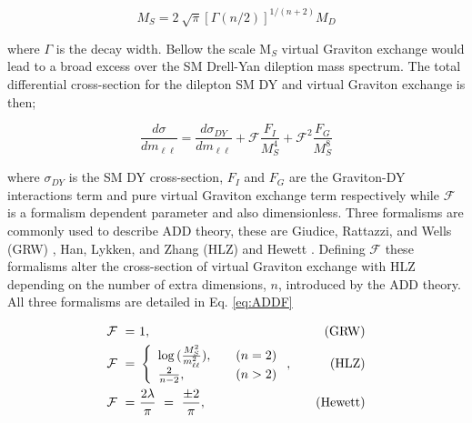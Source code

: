         \begin{equation}
            M_{S} = 2~\sqrt{\pi}\left[{\Gamma (n/2)}\right]^{1/(n+2)}M_{D}
            \label{eq:gravScale}
        \end{equation}

        where $\Gamma$ is the decay width. Bellow the scale M$_{S}$ virtual Graviton exchange would lead to a broad excess over the SM Drell-Yan dileption mass spectrum. 
        The total differential cross-section for the dilepton SM DY and virtual Graviton exchange is then;

        \begin{equation}
            \frac{d\sigma}{dm_{\ell\ell}} =
                \frac{d\sigma_{DY}}{dm_{\ell\ell}} +
                \mathcal{F}\frac{F_{I}}{M_{S}^{4}} +
                \mathcal{F}^{2}\frac{F_{G}}{M_{S}^{8}}
            \label{eq:ADDcs}
        \end{equation}

        where $\sigma_{DY}$ is the SM DY cross-section, $F_{I}$ and $F_{G}$ are the Graviton-DY interactions term and pure virtual Graviton exchange term respectively while $\mathcal{F}$ is a formalism dependent parameter and also dimensionless. 
        Three formalisms are commonly used to describe ADD theory, these are Giudice, Rattazzi, and Wells (GRW) \cite{Giudice:1998ck}, Han, Lykken, and Zhang (HLZ) \cite{PhysRevD.59.105006} and Hewett \cite{PhysRevLett.82.4765}. Defining $\mathcal{F}$ these formalisms alter the cross-section of virtual Graviton exchange with HLZ depending on the number of extra dimensions, $n$, introduced by the ADD theory. All three formalisms are detailed in Eq. \ref{eq:ADDF}

        \begin{equation}
            \begin{aligned}
                \mathcal{F}~=&~1,   \quad &\text{(GRW)} \\
                \mathcal{F}~=&~  \left\{ 
                    \begin{array}{l l}
                        \log{(\frac{M_{S}^{2}}{m_{\ell\ell}^{2}})},      \quad & (n = 2) \\
                        \frac{2}{n-2},                                   \quad & (n > 2)
                    \end{array} \right.,  \quad &\text{(HLZ)}  \\
                \mathcal{F}~=&~\frac{2\lambda}{\pi}~=~\frac{\pm2}{\pi},     \quad &\text{(Hewett)}
            \end{aligned}
            \label{eq:ADDF}
        \end{equation}


